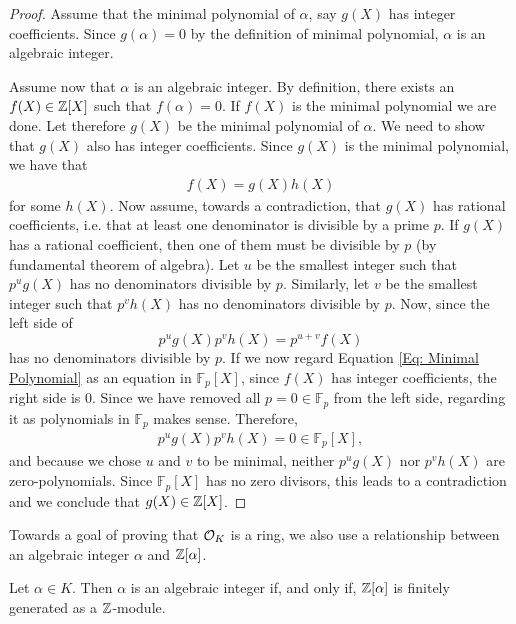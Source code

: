     \begin{proof}
        Assume that the minimal polynomial of \(\alpha\), say \(g(X)\) has integer coefficients. Since \(g(\alpha) = 0\) by the definition of minimal polynomial, \(\alpha\) is an algebraic integer. \par
        Assume now that \(\alpha\) is an algebraic integer. By definition, there exists an \(f(X)\in\mathbb{Z} [X]\) such that \(f(\alpha) = 0\). If \(f(X)\) is the minimal polynomial we are done. Let therefore \(g(X)\) be the minimal polynomial of \(\alpha\). We need to show that \(g(X)\) also has integer coefficients. Since \(g(X)\) is the minimal polynomial, we have that 
        \begin{align*}
            f(X) = g(X)h(X)
        \end{align*}
        for some \(h(X)\). Now assume, towards a contradiction, that \(g(X)\) has rational coefficients, i.e. that at least one denominator is divisible by a prime \(p\). If \(g(X)\) has a rational coefficient, then one of them must be divisible by \(p\) (by fundamental theorem of algebra). Let \(u\) be the smallest integer such that \(p^ug(X)\) has no denominators divisible by \(p\). Similarly, let \(v\) be the smallest integer such that \(p^vh(X)\) has no denominators divisible by \(p\). Now, since the left side of
        \begin{equation}
        \label{Eq: Minimal Polynomial}
           p^ug(X)p^vh(X) = p^{u + v}f(X)
        \end{equation}
        has no denominators divisible by \(p\). If we now regard Equation \eqref{Eq: Minimal Polynomial} as an equation in \(\mathbb{F}_p[X]\), since \(f(X)\) has integer coefficients, the right side is \(0\). Since we have removed all \(p=0\in\mathbb{F}_p\) from the left side, regarding it as polynomials in \(\mathbb{F}_p\) makes sense. Therefore,
        \begin{align*}
            p^ug(X)p^vh(X) = 0\in\mathbb{F}_p[X],
        \end{align*}
        and because we chose \(u\) and \(v\) to be minimal, neither \(p^ug(X)\) nor \(p^vh(X)\) are zero-polynomials. Since \(\mathbb{F}_p[X]\) has no zero divisors, this leads to a contradiction and we conclude that \(g(X)\in\mathbb{Z}[X]\).
    \end{proof}
    Towards a goal of proving that \(\mathcal{O}_K\) is a ring, we also use a relationship between an algebraic integer \(\alpha\) and \(\mathbb{Z}[\alpha]\).
    \begin{proposition}
    \label{Prop: Equivalence Algebraic Integer and Finitely Generated Z-module}
        Let \(\alpha\in K\). Then \(\alpha\) is an algebraic integer if, and only if, \(\mathbb{Z}[\alpha]\) is finitely generated as a \(\mathbb{Z}\)-module. 
    \end{proposition}
